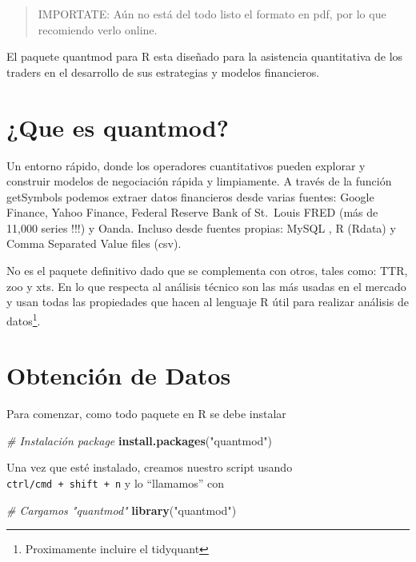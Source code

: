 \documentclass[12pt,]{book}
\newenvironment{Shaded}{\begin{snugshade}}{\end{snugshade}}
\newcommand{\KeywordTok}[1]{\textcolor[rgb]{0.13,0.29,0.53}{\textbf{#1}}}
\newcommand{\StringTok}[1]{\textcolor[rgb]{0.31,0.60,0.02}{#1}}
\newcommand{\CommentTok}[1]{\textcolor[rgb]{0.56,0.35,0.01}{\textit{#1}}}
\newcommand{\NormalTok}[1]{#1}
\begin{document}
\begin{quote}
IMPORTATE: Aún no está del todo listo el formato en pdf, por lo que
recomiendo verlo online.
\end{quote}

El paquete quantmod para R esta diseñado para la asistencia quantitativa
de los traders en el desarrollo de sus estrategias y modelos
financieros.

\section{¿Que es quantmod?}\label{que-es-quantmod}

Un entorno rápido, donde los operadores cuantitativos pueden explorar y
construir modelos de negociación rápida y limpiamente. A través de la
función getSymbols podemos extraer datos financieros desde varias
fuentes: Google Finance, Yahoo Finance, Federal Reserve Bank of
St.~Louis FRED (más de 11,000 series !!!) y Oanda. Incluso desde fuentes
propias: MySQL , R (Rdata) y Comma Separated Value files (csv).

No es el paquete definitivo dado que se complementa con otros, tales
como: TTR, zoo y xts. En lo que respecta al análisis técnico son las más
usadas en el mercado y usan todas las propiedades que hacen al lenguaje
R útil para realizar análisis de datos\footnote{Proximamente incluire el
  tidyquant}.

\section{Obtención de Datos}\label{obtencion-de-datos}

Para comenzar, como todo paquete en R se debe instalar

\begin{Shaded}
\begin{Highlighting}[]
\CommentTok{# Instalación package}
\KeywordTok{install.packages}\NormalTok{(}\StringTok{"quantmod"}\NormalTok{)}
\end{Highlighting}
\end{Shaded}

Una vez que esté instalado, creamos nuestro script usando
\texttt{ctrl/cmd\ +\ shift\ +\ n} y lo ``llamamos'' con

\begin{Shaded}
\begin{Highlighting}[]
\CommentTok{# Cargamos "quantmod"}
\KeywordTok{library}\NormalTok{(}\StringTok{"quantmod"}\NormalTok{)}
\end{Highlighting}
\end{Shaded}
\end{document}
